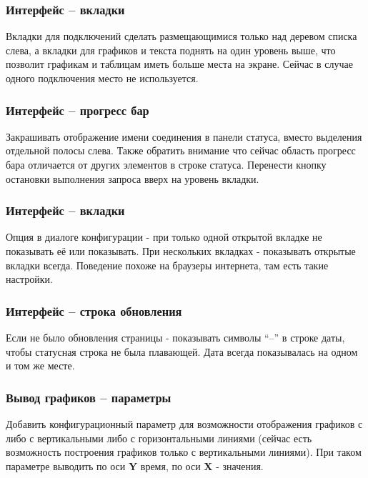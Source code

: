 \subsubsection{Интерфейс -- вкладки}

Вкладки для подключений сделать размещающимися только над деревом списка слева, а вкладки для
графиков и текста поднять на один уровень выше, что позволит графикам и таблицам иметь больше места
на экране. Сейчас в случае одного подключения место не используется.

\subsubsection{Интерфейс -- прогресс бар}

Закрашивать отображение имени соединения в панели статуса, вместо выделения отдельной полосы слева.
Также обратить внимание что сейчас область прогресс бара отличается от других элементов в строке
статуса. Перенести кнопку остановки выполнения запроса вверх на уровень вкладки.

\subsubsection{Интерфейс -- вкладки}

Опция в диалоге конфигурации - при только одной открытой вкладке не показывать её или показывать.
При нескольких вкладках - показывать открытые вкладки всегда. Поведение похоже на браузеры
интернета, там есть такие настройки.

\subsubsection{Интерфейс -- строка обновления}

Если не было обновления страницы - показывать символы ``--'' в строке даты, чтобы статусная строка
не была плавающей. Дата всегда показывалась на одном и том же месте.

\subsubsection{Вывод графиков -- параметры}

\iffalse

Добавить конфигурационный параметр для возможности отображения графиков с либо с вертикальными либо
с горизонтальными линиями (сейчас есть возможность построения графиков только с вертикальными
линиями). При таком параметре выводить по оси \textbf{Y} время, по оси \textbf{X} - значения.

